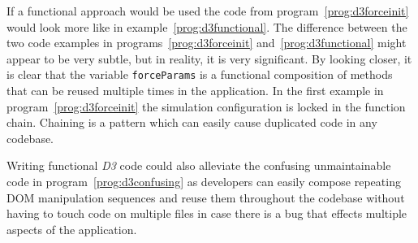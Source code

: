 If a functional approach would be used the code from program~\ref{prog:d3forceinit} would look more like in example~\ref{prog:d3functional}. The difference between the two code examples in programs~\ref{prog:d3forceinit} and~\ref{prog:d3functional} might appear to be very subtle, but in reality, it is very sig\-nifi\-cant. By looking closer, it is clear that the variable \texttt{forceParams} is a functional composition of methods that can be reused multiple times in the application. In the first example in program~\ref{prog:d3forceinit} the simulation configuration is locked in the function chain. Chaining is a pattern which can easily cause duplicated code in any codebase. 

Writing functional \emph{D3} code could also alleviate the confusing unmaintainable code in program~\ref{prog:d3confusing} as developers can easily compose repeating DOM manipulation sequences and reuse them throughout the codebase without having to touch code on multiple files in case there is a bug that effects multiple aspects of the application.
